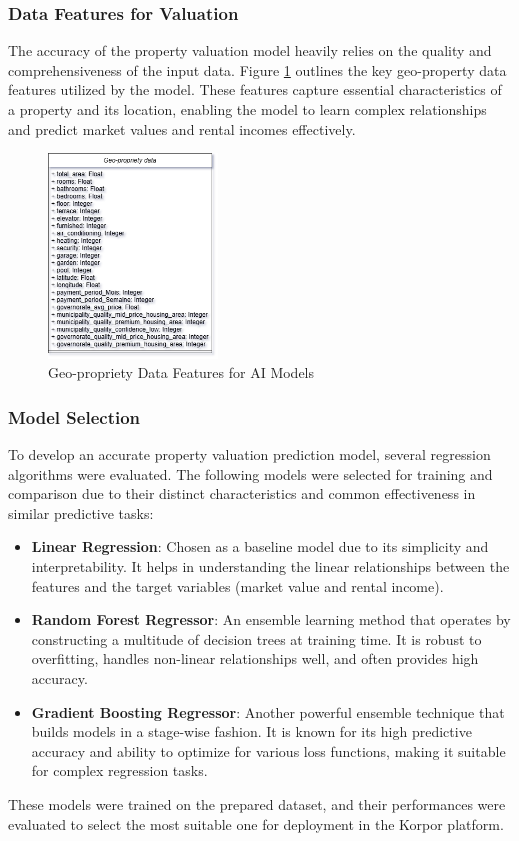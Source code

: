 \subsubsection{Data Features for Valuation}
The accuracy of the property valuation model heavily relies on the quality and comprehensiveness of the input data. Figure \ref{fig:geo-propriety-data} outlines the key geo-property data features utilized by the model. These features capture essential characteristics of a property and its location, enabling the model to learn complex relationships and predict market values and rental incomes effectively.
\newpage
\begin{figure}[htbp]
    \centering
    \includegraphics[width=0.4\textwidth]{images/geo-propriety-data.png} %
    \caption{Geo-propriety Data Features for AI Models}
    \label{fig:geo-propriety-data}
\end{figure}

\subsubsection{Model Selection}
To develop an accurate property valuation prediction model, several regression algorithms were evaluated. The following models were selected for training and comparison due to their distinct characteristics and common effectiveness in similar predictive tasks:
\begin{itemize}
    \item \textbf{Linear Regression}: Chosen as a baseline model due to its simplicity and interpretability. It helps in understanding the linear relationships between the features and the target variables (market value and rental income).
    \item \textbf{Random Forest Regressor}: An ensemble learning method that operates by constructing a multitude of decision trees at training time. It is robust to overfitting, handles non-linear relationships well, and often provides high accuracy.
    \item \textbf{Gradient Boosting Regressor}: Another powerful ensemble technique that builds models in a stage-wise fashion. It is known for its high predictive accuracy and ability to optimize for various loss functions, making it suitable for complex regression tasks.
\end{itemize}
These models were trained on the prepared dataset, and their performances were evaluated to select the most suitable one for deployment in the Korpor platform.


